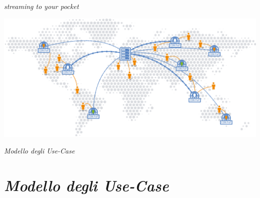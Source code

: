 \documentclass{article}
\author{Agosta, Belli, Emili, Giacchini, Luciani}
\begin{document}
\begin{center}
    \sffamily{\fontsize{50}{48} \selectfont \textcolor{red}{Nexi}\textcolor{green}{Fy}}
\end{center}

\begin{center}
    \itshape{\fontsize{20}{48} \selectfont streaming to your pocket}
\end{center}

\bigskip\bigskip\bigskip

\begin{flushleft}
    \includegraphics[scale=1]{../images/worldCDN.png}
\end{flushleft}

\bigskip\bigskip\bigskip

\begin{center}
    \itshape{\fontsize{30}{48} \selectfont Modello degli Use-Case}
\end{center}

\newpage
\printindex

\newpage
\section{\itshape{Modello degli Use-Case}}

\end{document}
